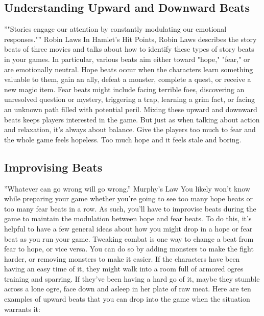 \documentclass[10pt,a4paper,twoside,bg=print,twocolumn,openany,nodeprecatedcode]{dndbook}
\begin{document}
\subsection{Understanding Upward and Downward Beats}
\DndQuote%
{}
{''"Stories engage our attention by constantly modulating our emotional responses."''}
{Robin Laws}
In Hamlet's Hit Points, Robin Laws describes the story beats of three movies and talks about how to identify these types of story beats in your games. In particular, various beats aim either toward "hope," "fear," or are emotionally neutral. Hope beats occur when the characters learn something valuable to them, gain an ally, defeat a monster, complete a quest, or receive a new magic item. Fear beats might include facing terrible foes, discovering an unresolved question or mystery, triggering a trap, learning a grim fact, or facing an unknown path filled with potential peril.
Mixing these upward and downward beats keeps players interested in the game. But just as when talking about action and relaxation, it's always about balance. Give the players too much to fear and the whole game feels hopeless. Too much hope and it feels stale and boring.
\subsection{Improvising Beats}
\DndQuote%
{}
{''Whatever can go wrong will go wrong.''}
{Murphy's Law}
You likely won't know while preparing your game whether you're going to see too many hope beats or too many fear beats in a row. As such, you'll have to improvise beats during the game to maintain the modulation between hope and fear beats. To do this, it's helpful to have a few general ideas about how you might drop in a hope or fear beat as you run your game.
Tweaking combat is one way to change a beat from fear to hope, or vice versa. You can do so by adding monsters to make the fight harder, or removing monsters to make it easier. If the characters have been having an easy time of it, they might walk into a room full of armored ogres training and sparring. If they've been having a hard go of it, maybe they stumble across a lone ogre, face down and asleep in her plate of raw meat.
Here are ten examples of upward beats that you can drop into the game when the situation warrants it:
\end{document}
